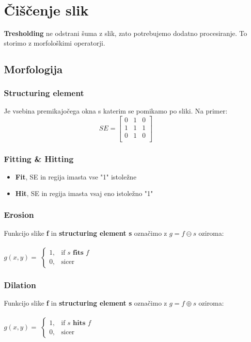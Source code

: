 \documentclass[11pt]{article}
\begin{document}
\newpage

\section{\v{C}i\v{s}\v{c}enje slik}
\textbf{Tresholding} ne odstrani \v{s}uma z slik, zato potrebujemo dodatno procesiranje. To storimo z morfolo\v{s}kimi operatorji.

\subsection{Morfologija}

\subsubsection*{Structuring element}
Je vsebina premikajo\v{c}ega okna s katerim se pomikamo po sliki. Na primer: \\
 \[
   SE =
  \left[ {\begin{array}{ccccccccc}
   0 & 1 & 0 \\
   1 & 1 & 1 \\
   0 & 1 & 0 \\
  \end{array} } \right]
\]

\subsubsection*{Fitting \& Hitting}
\begin{itemize}
\item \textbf{Fit}, SE in regija imasta vse "1" istole\v{z}ne
\item \textbf{Hit}, SE in regija imasta vsaj eno istole\v{z}no "1"
\end{itemize}

\subsubsection*{Erosion}
Funkcijo slike \textbf{f} in \textbf{structuring element s} ozna\v{c}imo z $g = f \ominus s$
oziroma: \\
\\
$g(x, y) = $
$
\begin{cases}
	1, & \text{if } s \textbf{ fits } f \\
	0, & \text{sicer}
\end{cases}
$

\subsubsection*{Dilation}
Funkcijo slike \textbf{f} in \textbf{structuring element s} ozna\v{c}imo z $g = f \oplus s$
oziroma: \\
\\
$g(x, y) = $
$
\begin{cases}
	1, & \text{if } s \textbf{ hits } f \\
	0, & \text{sicer}
\end{cases}
$
\end{document}
